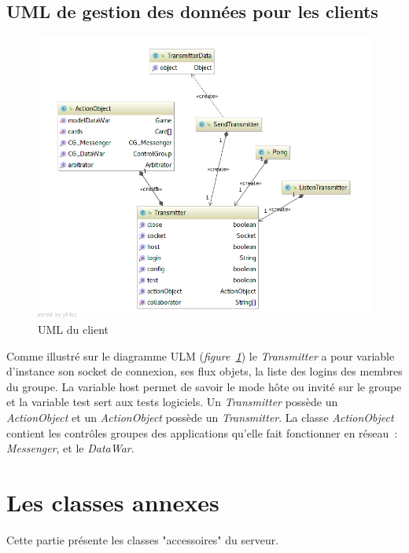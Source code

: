 \documentclass[a4paper, titlepage]{livret}
\begin{document}
\subsection{UML de gestion des données pour les clients}
 \begin{figure}[th]
      \begin{center}
        \includegraphics[scale=0.3]{Assets/UML_client.png}
        \caption{UML du client}
        \label{UML du client}
      \end{center}
    \end{figure}
    
  Comme illustré sur le diagramme ULM (\textit{figure~\ref{UML du client}}) le \textit{Transmitter} a pour variable d’instance son socket de connexion, ses flux objets, la liste des logins des membres du groupe. La variable host permet de savoir le mode hôte ou invité sur le groupe et la variable test sert aux tests logiciels. Un \textit{Transmitter} possède un \textit{ActionObject} et un \textit{ActionObject} possède un \textit{Transmitter}. La classe \textit{ActionObject} contient les contrôles groupes des applications qu’elle fait fonctionner en réseau : \textit{Messenger}, et le \textit{DataWar}.



\section{Les classes annexes}

Cette partie présente les classes "accessoires" du serveur.
\end{document}
